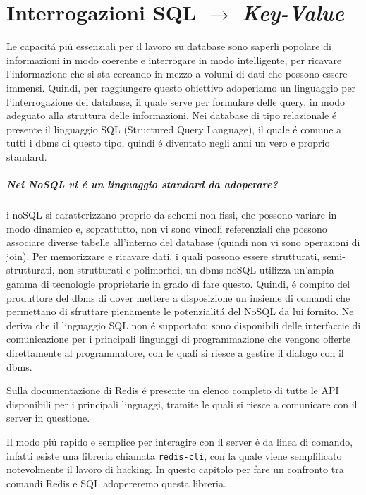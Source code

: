 \chapter{Interrogazioni SQL $\to$ \emph{Key-Value}}
Le capacitá piú essenziali per il lavoro su database sono saperli popolare di informazioni in modo coerente e interrogare in modo
intelligente, per ricavare l'informazione che si sta cercando in mezzo a volumi di dati che possono essere immensi.
Quindi, per raggiungere questo obiettivo adoperiamo un linguaggio per l'interrogazione dei database, il quale serve per formulare delle
query, in modo adeguato alla struttura delle informazioni.
Nei database di tipo relazionale é presente il linguaggio SQL (Structured Query Language), il quale é comune a tutti i dbms di questo tipo, quindi
é diventato negli anni un vero e proprio standard.

\paragraph{Nei NoSQL vi é un linguaggio standard da adoperare?\\}
i noSQL si caratterizzano proprio da schemi non fissi, che possono variare in modo dinamico e, soprattutto, non vi sono vincoli referenziali che possono associare
diverse tabelle all'interno del database (quindi non vi sono operazioni di join).
Per memorizzare e ricavare dati, i quali possono essere strutturati, semi-strutturati, non strutturati e polimorfici, un dbms noSQL utilizza un'ampia gamma di
tecnologie proprietarie in grado di fare questo. Quindi, é compito del produttore del dbms di dover mettere a disposizione un insieme di comandi che permettano di sfruttare pienamente le potenzialitá del NoSQL da lui fornito.
Ne deriva che il linguaggio SQL non é supportato; sono disponibili delle interfaccie di comunicazione per i principali linguaggi di programmazione che vengono
offerte direttamente al programmatore, con le quali si riesce a gestire il dialogo con il dbms.

Sulla documentazione di Redis é presente un elenco completo di tutte le API disponibili per i principali linguaggi, tramite le quali si riesce a comunicare con il server in questione.

Il modo piú rapido e semplice per interagire con il server é da linea di comando, infatti esiste una libreria chiamata
\texttt{redis-cli}, con la quale viene semplificato notevolmente il lavoro di hacking.
In questo capitolo per fare un confronto tra comandi Redis e SQL adopereremo questa libreria.\\


